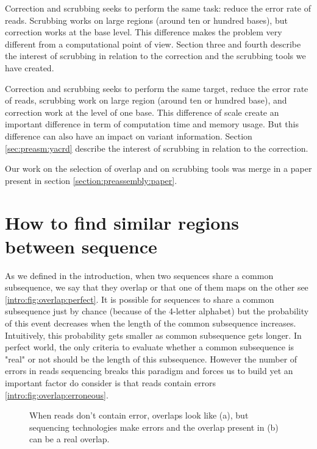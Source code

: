 \documentclass[main.tex]{subfiles}
\begin{document}
Correction and scrubbing seeks to perform the same task: reduce the error rate of reads. Scrubbing works on large regions (around ten or hundred bases), but correction works at the base level. This difference makes the problem very different from a computational point of view. Section three and fourth describe the interest of scrubbing in relation to the correction and the scrubbing tools we have created.

Correction and scrubbing seeks to perform the same target, reduce the error rate of reads, scrubbing work on large region (around ten or hundred base), and correction work at the level of one base. This difference of scale create an important difference in term of computation time and memory usage. But this difference can also have an impact on variant information. Section \ref{sec:preasm:yacrd} describe the interest of scrubbing in relation to the correction.

Our work on the selection of overlap and on scrubbing tools was merge in a paper present in section \ref{section:preassembly:paper}.

\section{How to find similar regions between sequence} \label{sec:preasm:ovl}

As we defined in the introduction, when two sequences share a common subsequence, we say that they overlap or that one of them maps on the other see \ref{intro:fig:overlap:perfect}. It is possible for sequences to share a common subsequence just by chance (because of the 4-letter alphabet) but the probability of this event decreases when the length of the common subsequence increases. Intuitively, this probability gets smaller as common subsequence gets longer. In perfect world, the only criteria to evaluate whether a common subsequence is "real" or not should be the length of this subsequence. However the number of errors in reads sequencing breaks this paradigm and forces us to build yet an important factor do consider is that reads contain errors \ref{intro:fig:overlap:erroneous}.

\begin{figure}[ht]
    \centering
    \caption{When reads don't contain error, overlaps look like (a), but sequencing technologies make errors and the overlap present in (b) can be a real overlap.}
    \label{intro:fig:overlap}
\end{figure}
\end{document}
